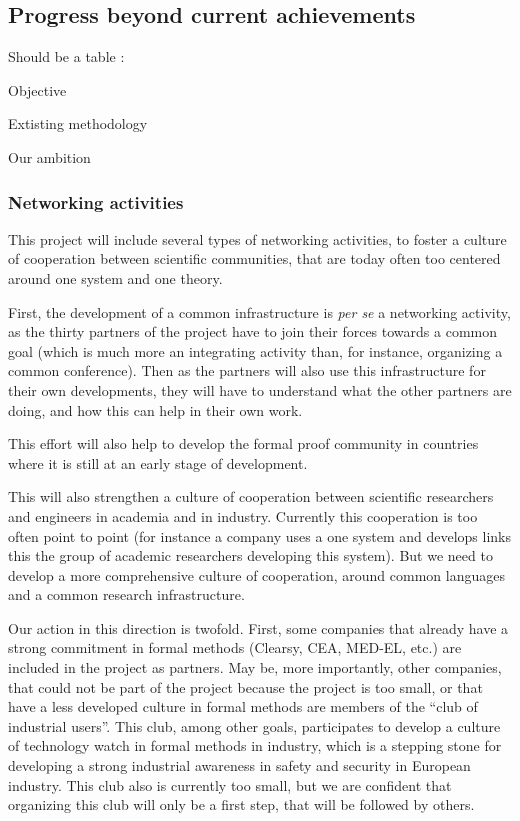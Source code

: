 \subsection{Progress beyond current achievements}


{\color{red} Should be a table :

  Objective

  Extisting methodology

  Our ambition}


\subsubsection*{Networking activities}

This project will include several types of networking activities, to
foster a culture of cooperation between scientific communities, that
are today often too centered around one system and one theory.

First, the development of a common infrastructure is \emph{per se} a
networking activity, as the thirty partners of the project have to join
their forces towards a common goal (which is much more an integrating
activity than, for instance, organizing a common conference). Then as
the partners will also use this infrastructure for their own
developments, they will have to understand what the other partners are
doing, and how this can help in their own work.

This effort will also help to develop the formal proof community in
countries where it is still at an early stage of development.

This will also strengthen a culture of cooperation between scientific
researchers and engineers in academia and in industry. Currently this
cooperation is too often point to point (for instance a company uses a
one system and develops links this the group of academic researchers
developing this system). But we need to develop a more comprehensive
culture of cooperation, around common languages and a common research
infrastructure.

Our action in this direction is twofold. First, some companies that
already have a strong commitment in formal methods (Clearsy, CEA,
MED-EL, etc.) are included in the project as partners. May be, more
importantly, other companies, that could not be part of the project
because the project is too small, or that have a less developed
culture in formal methods are members of the ``club of industrial
users''. This club, among other goals, participates to develop a
culture of technology watch in formal methods in industry, which is a
stepping stone for developing a strong industrial awareness in safety
and security in European industry. This club also is currently too
small, but we are confident that organizing this club will only be a
first step, that will be followed by others.

